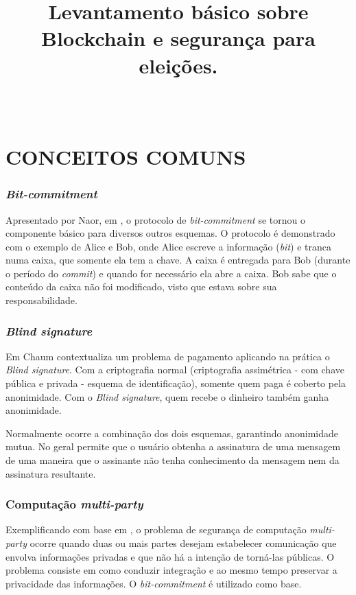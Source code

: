 \documentclass[letterpaper, 12 pt, conference]{ieeeconf}
\title{\LARGE \bf
Levantamento básico sobre Blockchain e segurança para eleições.
}
\author{\\%
}
\begin{document}
\maketitle
\thispagestyle{empty}
\pagestyle{empty}

\chapter{\textbf{CONCEITOS COMUNS}}
    \subsection{\textit{Bit-commitment}}
        Apresentado por Naor, em \cite{naor1991bit}, o protocolo de \textit{bit-commitment} se tornou o componente básico para diversos outros esquemas. O protocolo é demonstrado com o exemplo de Alice e Bob, onde  Alice escreve a informação (\textit{bit}) e tranca numa caixa, que somente ela tem a chave. A caixa é entregada para Bob (durante o período do \textit{commit}) e quando for necessário ela abre a caixa. Bob sabe que o conteúdo da caixa não foi modificado, visto que estava sobre sua responsabilidade. 
        
        
        
    \subsection{\textit{Blind signature}}
        Em \cite{chaum1984blind} Chaum contextualiza um problema de pagamento aplicando na prática o \textit{Blind signature}. Com a criptografia normal (criptografia assimétrica - com chave pública e privada - esquema de identificação), somente quem paga é coberto pela anonimidade. Com o \textit{Blind signature}, quem recebe o dinheiro também ganha anonimidade. 
        
        Normalmente ocorre a combinação dos dois esquemas, garantindo anonimidade mutua. No geral permite que o usuário obtenha a assinatura de uma mensagem de uma maneira que o assinante não tenha conhecimento da mensagem nem da assinatura resultante. 
        
    \subsection{ Computação \textit{multi-party}}
        Exemplificando com base em \cite{Du:2001:SMC:508171.508174}, o problema de segurança de computação \textit{multi-party} ocorre quando duas ou mais partes desejam estabelecer comunicação que envolva informações privadas e que não há a intenção de torná-las públicas. O problema consiste em como conduzir integração e ao mesmo tempo preservar a privacidade das informações. O \textit{bit-commitment} é utilizado como base.
        
\end{document}
